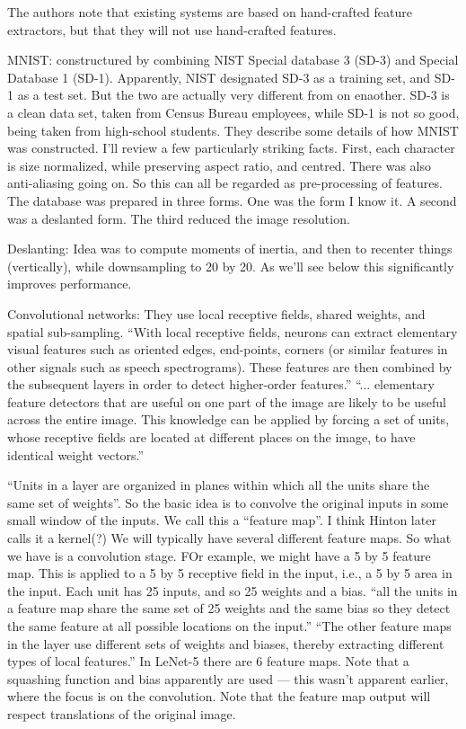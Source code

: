 \documentclass[12pt]{report}
\begin{document}
The authors note that existing systems are based on hand-crafted
feature extractors, but that they will not use hand-crafted features.

MNIST: constructured by combining NIST Special database 3 (SD-3) and
Special Database 1 (SD-1).  Apparently, NIST designated SD-3 as a
training set, and SD-1 as a test set.  But the two are actually very
different from on enaother.  SD-3 is a clean data set, taken from
Census Bureau employees, while SD-1 is not so good, being taken from
high-school students.  They describe some details of how MNIST was
constructed.  I'll review a few particularly striking facts.  First,
each character is size normalized, while preserving aspect ratio, and
centred.  There was also anti-aliasing going on.  So this can all be
regarded as pre-processing of features.  The database was prepared in
three forms.  One was the form I know it.  A second was a deslanted
form.  The third reduced the image resolution.

Deslanting: Idea was to compute moments of inertia, and then to
recenter things (vertically), while downsampling to 20 by 20.  As
we'll see below this significantly improves performance.

Convolutional networks: They use local receptive fields, shared
weights, and spatial sub-sampling.  ``With local receptive fields,
neurons can extract elementary visual features such as oriented edges,
end-points, corners (or similar features in other signals such as
speech spectrograms).  These features are then combined by the
subsequent layers in order to detect higher-order features.''
``... elementary feature detectors that are useful on one part of the
image are likely to be useful across the entire image.  This knowledge
can be applied by forcing a set of units, whose receptive fields are
located at different places on the image, to have identical weight
vectors.''

``Units in a layer are organized in planes within which all the units
share the same set of weights''.  So the basic idea is to convolve the
original inputs in some small window of the inputs.  We call this a
``feature map''.  I think Hinton later calls it a kernel(?)  We will
typically have several different feature maps.  So what we have is a
convolution stage.  FOr example, we might have a 5 by 5 feature map.
This is applied to a 5 by 5 receptive field in the input, i.e., a 5 by
5 area in the input.  Each unit has 25 inputs, and so 25 weights and a
bias.  ``all the units in a feature map share the same set of 25
weights and the same bias so they detect the same feature at all
possible locations on the input.''  ``The other feature maps in the
layer use different sets of weights and biases, thereby extracting
different types of local features.''  In LeNet-5 there are 6 feature
maps.  Note that a squashing function and bias apparently are used ---
this wasn't apparent earlier, where the focus is on the convolution.
Note that the feature map output will respect translations of the
original image.
\end{document}
